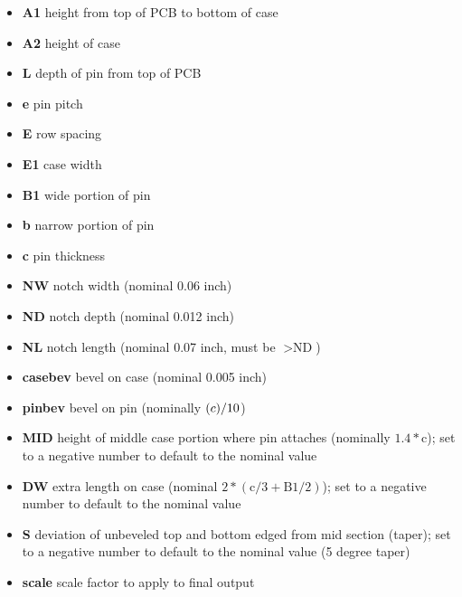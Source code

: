 \documentclass[a4paper, dvipdfm]{article}
\begin{document}
\begin{itemize}
\item\textbf{A1} height from top of PCB to bottom of case\\
\item\textbf{A2} height of case\\
\item\textbf{L} depth of pin from top of PCB\\
\item\textbf{e} pin pitch\\
\item\textbf{E} row spacing\\
\item\textbf{E1} case width\\
\item\textbf{B1} wide portion of pin\\
\item\textbf{b} narrow portion of pin\\
\item\textbf{c} pin thickness\\
\item\textbf{NW} notch width (nominal 0.06 inch)\\
\item\textbf{ND} notch depth (nominal 0.012 inch)\\
\item\textbf{NL} notch length (nominal 0.07 inch, must be $>\textrm{ND}$)\\
\item\textbf{casebev} bevel on case (nominal 0.005 inch)\\
\item\textbf{pinbev} bevel on pin (nominally $\textrm(c)/10$)\\
\item\textbf{MID} height of middle case portion where pin attaches (nominally $1.4*\textrm{c}$);
    set to a negative number to default to the nominal value\\
\item\textbf{DW} extra length on case (nominal $2*(\textrm{c}/3 + \textrm{B}1/2)$);
    set to a negative number to default to the nominal value\\
\item\textbf{S} deviation of unbeveled top and bottom edged from mid section (taper);
    set to a negative number to default to the nominal value (5 degree taper)\\
\item\textbf{scale} scale factor to apply to final output\\
\end{itemize}
\end{document}
